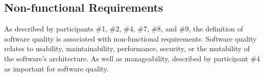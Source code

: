 




\subsection{Non-functional Requirements} \label{sec:non_functional_requirements_results}
As described by participants \#1, \#2, \#4, \#7, \#8, and \#9, the definition of software quality is associated with non-functional requirements. Software quality relates to usability, maintainability, performance, security, or the mutability of the software's architecture. As well as manageability, described by participant \#4 as important for software quality. 

